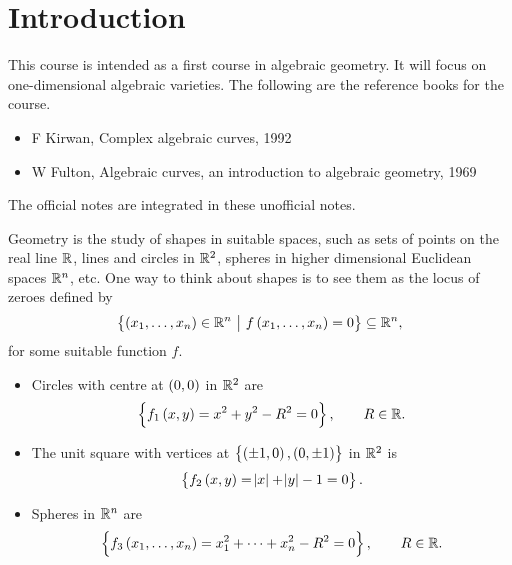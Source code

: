 \def\syllabus{Affine plane algebraic curves. Projective space. Plane projective curves. Projectivisation. Points at infinity. Singularities. Smoothness. Intersections of plane curves. Resultants. Multiplicities. B\'ezout's theorem. Conics. Cubic curves. Riemann surfaces. Genus. Ramification. The Riemann-Hurwitz formula. The degree-genus formula.}
\def\thm{section}







\setcounter{section}{0}

\section{Introduction}


This course is intended as a first course in algebraic geometry. It will focus on one-dimensional algebraic varieties. The following are the reference books for the course.
\begin{itemize}
\item F Kirwan, Complex algebraic curves, 1992
\item W Fulton, Algebraic curves, an introduction to algebraic geometry, 1969
\end{itemize}

\begin{note*}
The official notes are integrated in these unofficial notes.
\end{note*}

Geometry is the study of shapes in suitable spaces, such as sets of points on the real line $ \mathbb{R} $, lines and circles in $ \mathbb{R}^2 $, spheres in higher dimensional Euclidean spaces $ \mathbb{R}^n $, etc. One way to think about shapes is to see them as the locus of zeroes defined by
$$ \cbr{\br{x_1, \dots, x_n} \in \RR^n \st f\br{x_1, \dots, x_n} = 0} \subseteq \RR^n, $$
for some suitable function $ f $.

\begin{example}
\label{eg:1.1}
\hfill
\begin{itemize}
\item Circles with centre at $ \br{0, 0} $ in $ \mathbb{R}^2 $ are
$$ \cbr{f_1\br{x, y} = x^2 + y^2 - R^2 = 0}, \qquad R \in \RR. $$
\item The unit square with vertices at $ \cbr{\br{\pm 1, 0}, \br{0, \pm 1}} $ in $ \mathbb{R}^2 $ is
$$ \cbr{f_2\br{x, y} = \abs{x} + \abs{y} - 1 = 0}. $$
\item Spheres in $ \mathbb{R}^n $ are
$$ \cbr{f_3\br{x_1, \dots, x_n} = x_1^2 + \dots + x_n^2 - R^2 = 0}, \qquad R \in \RR. $$
\end{itemize}
\end{example}

